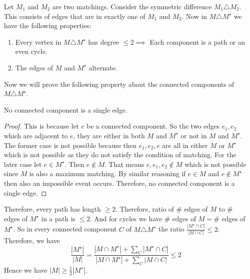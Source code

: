 \begin{alternate-proof} 
	Let $M_1$ and $M_2$ are two matchings. Consider the symmetric difference $M_1\triangle M_2$.  This consists of edges that are in exactly one of $M_1$ and $M_2$. Now in $M\triangle M^{\star}$ we have the following properties:
	\begin{enumerate}[label=(\alph*)]
		\item Every vertex in $M\triangle M^{\star}$ has degree $\leq 2\implies $ Each component is a path or an even cycle. 
		\item The edges of $M$ and $M^{\star}$ alternate. 
			\end{enumerate}
		Now we will prove the following property about the connected components of $M\triangle M^{\star}$.
		
\begin{center}
					
	\begin{minipage}{0.9\textwidth}
		\begin{claim}{}{}
			No connected component is a single edge. 
		\end{claim}		
		\begin{proof}
			This is because let $e$ be a connected component. So the two edges $e_1,e_2$ which are adjacent to $e$,  they are either in both $M$ and $M^{\star}$ or not in $M$ and $M^{\star}$. The former case is not possible because then $e_1,e_2,e$ are all in either $M$ or $M^{\star}$ which is not possible as they do not satisfy the condition of matching. For the later case let $e\in M^{\star}$. Then $e\notin M$. That means $e,e_1,e_2\notin M$ which is not possible since $M$ is also a maximum matching. By similar reasoning if $e\in M$ and $e\notin M^{\star}$ then also an impossible event occurs. Therefore, no connected component is a single edge.
		\end{proof}
	\end{minipage}
\end{center}

	
		Therefore, every path has length $\geq 2$. Therefore, ratio of $\#$ edges of $M$ to $\#$ edges of $M^{\star}$ in a path is $\leq 2$. And for cycles we have $\#$ edges of $M=\#$ edges of $M^{\star}$. So in every connected component $C$ of $M\triangle M^{\star}$ the ratio $\frac{|M^{\star}\cap C|}{|M\cap C|}\leq 2$. Therefore, we have $$\frac{|M^{\star}|}{|M|}=\frac{|M\cap M^{\star}|+\sum\limits_{C}|M^{\star}\cap C|}{|M\cap M^{\star}|+\sum\limits_{C}|M\cap C|}\leq 2$$Hence we have $|M|\geq \frac12|M^\star|$.
		

\end{alternate-proof}
